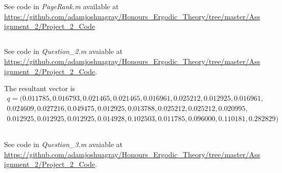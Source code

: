 \documentclass{unswmaths}
\begin{document}
\section{}
\subsection{}
See code in \emph{PageRank.m} available at \url{https://github.com/adamjoshuagray/Honours_Ergodic_Theory/tree/master/Assignment_2/Project_2_Code}

\subsection{}
See code in \emph{Question\_2.m} avaiable at \url{https://github.com/adamjoshuagray/Honours_Ergodic_Theory/tree/master/Assignment_2/Project_2_Code}. 

The resultant vector is
\begin{align*}    q =( 0.011785,   0.016793,   0.021465,   0.021465,   0.016961,   0.025212,   0.012925,   0.016961,\\
   0.024609,   0.027216,   0.049475,   0.012925,   0.013788,   0.025212,   0.025212,   0.020995,\\
   0.012925,   0.012925, 0.012925,   0.014928,   0.102503,   0.011785,   0.096000,   0.110181,   0.282829)
\end{align*}
\subsection{}
See code in \emph{Question\_3.m} avaiable at \url{https://github.com/adamjoshuagray/Honours_Ergodic_Theory/tree/master/Assignment_2/Project_2_Code}. 
\end{document}
